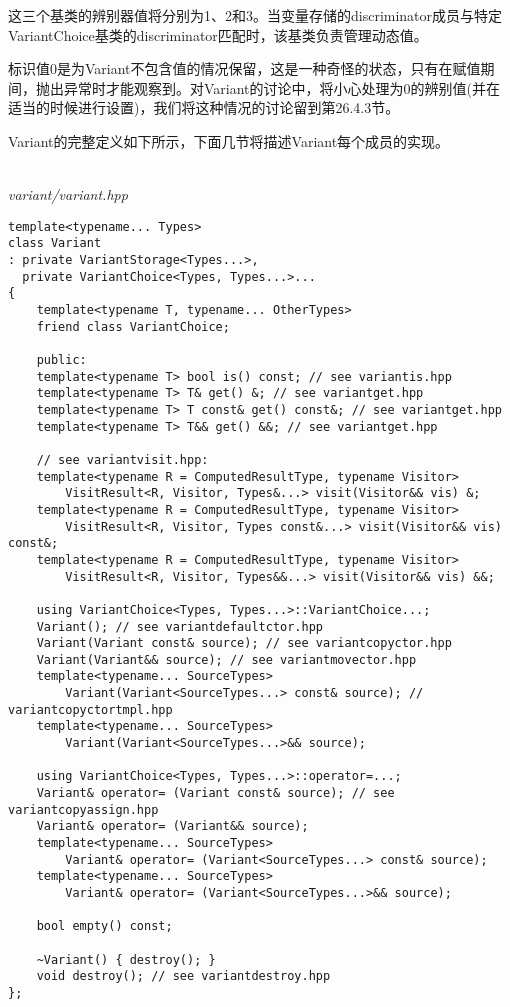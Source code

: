 这三个基类的辨别器值将分别为1、2和3。当变量存储的discriminator成员与特定VariantChoice基类的discriminator匹配时，该基类负责管理动态值。

标识值0是为Variant不包含值的情况保留，这是一种奇怪的状态，只有在赋值期间，抛出异常时才能观察到。对Variant的讨论中，将小心处理为0的辨别值(并在适当的时候进行设置)，我们将这种情况的讨论留到第26.4.3节。

Variant的完整定义如下所示，下面几节将描述Variant每个成员的实现。

\hspace*{\fill} \\ %
\noindent
\textit{variant/variant.hpp}
\begin{lstlisting}[style=styleCXX]
template<typename... Types>
class Variant
: private VariantStorage<Types...>,
  private VariantChoice<Types, Types...>...
{
	template<typename T, typename... OtherTypes>
	friend class VariantChoice;
	
	public:
	template<typename T> bool is() const; // see variantis.hpp
	template<typename T> T& get() &; // see variantget.hpp
	template<typename T> T const& get() const&; // see variantget.hpp
	template<typename T> T&& get() &&; // see variantget.hpp
	
	// see variantvisit.hpp:
	template<typename R = ComputedResultType, typename Visitor>
		VisitResult<R, Visitor, Types&...> visit(Visitor&& vis) &;
	template<typename R = ComputedResultType, typename Visitor>
		VisitResult<R, Visitor, Types const&...> visit(Visitor&& vis) const&;
	template<typename R = ComputedResultType, typename Visitor>
		VisitResult<R, Visitor, Types&&...> visit(Visitor&& vis) &&;
	
	using VariantChoice<Types, Types...>::VariantChoice...;
	Variant(); // see variantdefaultctor.hpp
	Variant(Variant const& source); // see variantcopyctor.hpp
	Variant(Variant&& source); // see variantmovector.hpp
	template<typename... SourceTypes>
		Variant(Variant<SourceTypes...> const& source); // variantcopyctortmpl.hpp
	template<typename... SourceTypes>
		Variant(Variant<SourceTypes...>&& source);
	
	using VariantChoice<Types, Types...>::operator=...;
	Variant& operator= (Variant const& source); // see variantcopyassign.hpp
	Variant& operator= (Variant&& source);
	template<typename... SourceTypes>
		Variant& operator= (Variant<SourceTypes...> const& source);
	template<typename... SourceTypes>
		Variant& operator= (Variant<SourceTypes...>&& source);
	
	bool empty() const;
	
	~Variant() { destroy(); }
	void destroy(); // see variantdestroy.hpp
};
\end{lstlisting}








